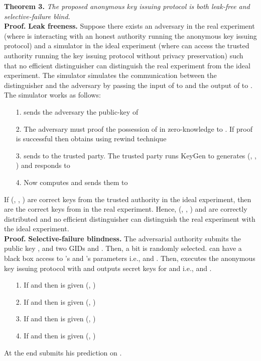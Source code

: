 \documentclass[10pt,journal]{IEEEtran}
\begin{document}
\noindent \textbf{Theorem 3.} \emph{The proposed anonymous key issuing protocol is both leak-free and selective-failure blind.}\\

\noindent \textbf{Proof.} \textbf{Leak freeness.}  Suppose there exists an adversary  in the real experiment (where  is interacting with an honest authority  running the anonymous key issuing protocol) and a simulator  in the
ideal experiment (where  can access the trusted authority running the key issuing protocol without privacy preservation) such that no efficient distinguisher  can distinguish the real experiment from the ideal experiment. The simulator  simulates the communication between the distinguisher  and the adversary  by passing the input of  to  and the output of  to .  The simulator  works as follows:
\begin{enumerate}
  \item[1.]  sends the adversary  the public-key  of 
  \item[2.] The adversary  must proof the possession of  in zero-knowledge to . If proof is successful then  obtains  using rewind technique
  \item[3.]  sends  to the trusted party. The trusted party runs KeyGen to generates (, , )  and responds to 
  \item[4.] Now   computes  and sends them to 
\end{enumerate}
If (, , ) are correct keys from the trusted authority in the ideal experiment, then  are the correct keys from  in the real experiment. Hence, (, , ) and  are correctly distributed and no efficient distinguisher can distinguish the real experiment with the ideal experiment.\\

\noindent \textbf{Proof.} \textbf{Selective-failure blindness.} The adversarial authority  submits the public key , and two GIDs  and . Then, a bit  is randomly selected.  can have a black box access to 's and 's parameters i.e.,  and . Then,  executes the anonymous key issuing protocol with  and outputs secret keys for  and  i.e.,  and .
\begin{itemize}
  \item[1.] If  and  then  is given (, )
  \item[2.] If  and  then  is given (, )
  \item[3.] If  and  then  is given (, )
  \item[4.] If  and  then  is given (, )
\end{itemize}
At the end  submits his prediction on .
\end{document}
